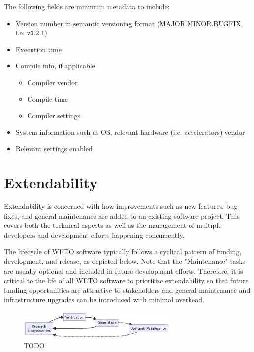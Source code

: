 \documentclass[]{nrel}
\begin{document}
The following fields are minimum metadata to include:
\begin{itemize}
\item Version number in \href{https://semver.org}{semantic versioning format} (MAJOR.MINOR.BUGFIX, i.e. v3.2.1)
\item Execution time

\item Compile info, if applicable
\begin{itemize}
\item Compiler vendor
\item Compile time
\item Compiler settings
\end{itemize}

\item System information such as OS, relevant hardware (i.e. accelerators) vendor
\item Relevant settings enabled

\end{itemize}


\chapter{Extendability}
\label{sec:extendability}
Extendability is concerned with how improvements such as new features, bug fixes, and general
maintenance are added to an existing software project. This covers both the technical aspects
as well as the management of multiple developers and development efforts happening
concurrently.

The lifecycle of WETO software typically follows a cyclical pattern of funding, development, and
release, as depicted below. Note that the "Maintenance" tasks are usually optional and included
in future development efforts. Therefore, it is critical to the life of all WETO software to
prioritize extendability so that future funding opportunities are attractive to stakeholders
and general maintenance and infrastructure upgrades can be introduced with minimal overhead.

\begin{figure}[htbp] \begin{center}
\includegraphics[width=0.7\textwidth]{mermaid-d1bafe392e85b8f467e3d93074dc8d7b7c45dfd0.png}
\caption{TODO}
\label{fig:fig2} \end{center} \end{figure}
\end{document}
